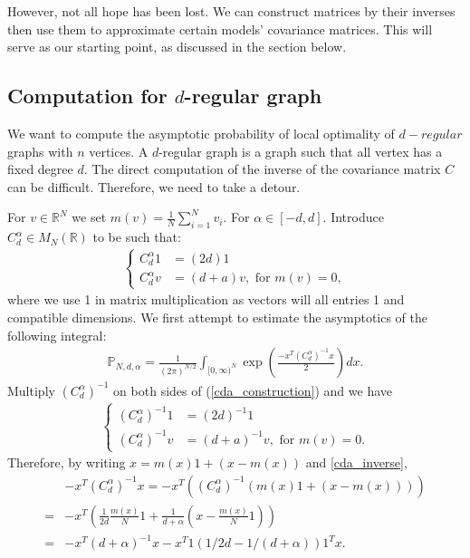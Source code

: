 \documentclass[10pt]{article}
\newcommand{\p}{\mathbb{P}}
\newenvironment{Proof of lemma}{\noindent{\bf Proof of Lemma}}{\hfill$\Box$\newline}
\newenvironment{Proof of claim}{\noindent{\bf Proof of claim}}{\hfill$\Box$\newline}
\newenvironment{Proof of theorem}{\noindent{\bf Proof of Theorem}}{\hfill\scriptsize{$\Box$}\newline}
\newenvironment{Proof of theorems}{\noindent{\bf Proof of Theorems}}{\hfill$\Box$\newline}
\newenvironment{Proof of proposition}{\noindent{\bf Proof of Proposition}}{\hfill$\Box$\newline}
\newenvironment{Proof of propositions}{\noindent{\bf Proof of Propositions}}{\hfill$\Box$\newline}
\newenvironment{Proof of exercise}{\noindent{\it Proof of Exercise:}}{\hfill$\Box$}
\numberwithin{equation}{section}
\begin{document}
However, not all hope has been lost. We can construct matrices by their inverses then use them to approximate certain models' covariance matrices. This will serve as our starting point, as discussed in the section below.
\subsection{Computation for \texorpdfstring{$d$}--regular graph}
We want to compute the asymptotic probability of local optimality of $d-regular$ graphs with $n$ vertices. A $d$-regular graph is a graph such that all vertex has a fixed degree $d$. The direct computation of the inverse of the covariance matrix $C$ can be difficult. Therefore, we need to take a detour.

For $v \in \mathbb{R}^N$ we set $m(v) = \frac{1}{N} \sum_{i=1}^N v_i$. For $\alpha \in [-d,d]$. Introduce $C_d^{\alpha} \in M_N(\mathbb{R})$ to be such that:
\begin{align} \label{cda_construction}
    \begin{cases}
    C_d^{\alpha}1&=(2d)1 \\
    C_d^{\alpha}v&=(d+a)v, \text{ for } m(v)=0,
    \end{cases}  
\end{align}
where we use 1 in matrix multiplication as vectors will all entries 1 and compatible dimensions. We first attempt to estimate the asymptotics of the following integral:
\begin{align} \label{cda_integral}
    \p_{N,d,\alpha} = \frac{1}{(2\pi)^{N/2}}\int_{[0,\infty)^N} \exp\left(\frac{-x^{T}(C_d^{\alpha})^{-1}x}{2}\right)dx.
\end{align}
Multiply $(C_d^{\alpha})^{-1}$ on both sides of (\ref{cda_construction}) and we have
\begin{align} \label{cda_inverse}
    \begin{cases}
    (C_d^{\alpha})^{-1}1&=(2d)^{-1}1 \\
    (C_d^{\alpha})^{-1}v&=(d+a)^{-1}v, \text{ for } m(v)=0.
    \end{cases}  
\end{align}
Therefore, by writing $x = m(x)1+(x-m(x))$ and \ref{cda_inverse},
\begin{align}
    &-x^{T}(C_d^{\alpha})^{-1}x = -x^{T}\left((C_d^{\alpha})^{-1}(m(x)1+(x-m(x)))\right) \nonumber \\
    =&-x^{T}\left(\frac{1}{2d}\frac{m(x)}{N}1+\frac{1}{d+\alpha}\left(x-\frac{m(x)}{N}1\right)\right) \nonumber \\
    =&-x^T(d+\alpha)^{-1}x-x^T1(1/2d-1/(d+\alpha))1^Tx.
\end{align}
\end{document}
